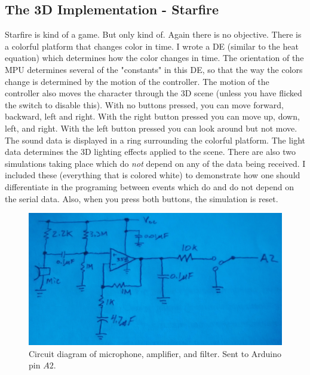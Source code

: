 \documentclass[paper=a4, fontsize=12pt]{scrartcl} 	%
\begin{document}
\subsection{The 3D Implementation - Starfire}
	Starfire is kind of a game.  But only kind of.  Again there is no objective.  There is a colorful platform that changes color in time.  I wrote a DE (similar to the heat equation) which determines how the color changes in time.  The orientation of the MPU determines several of the "constants" in this DE, so that the way the colors change is determined by the motion of the controller.  The motion of the controller also moves the character through the 3D scene (unless you have flicked the switch to disable this).  With no buttons pressed, you can move forward, backward, left and right.  With the right button pressed you can move up, down, left, and right.  With the left button pressed you can look around but not move.  The sound data is displayed in a ring surrounding the colorful platform.  The light data determines the 3D lighting effects applied to the scene.  There are also two simulations taking place which do \emph{not} depend on any of the data being received.  I included these (everything that is colored white) to demonstrate how one should differentiate in the programing between events which do and do not depend on the serial data.  Also, when you press both buttons, the simulation is reset.  


	

\begin{figure}
	\includegraphics[scale=0.14]{mic.jpg}
	\caption{\label{mic} Circuit diagram of microphone, amplifier, and filter.  Sent to Arduino pin $A2$.}
\end{figure}
\end{document}
